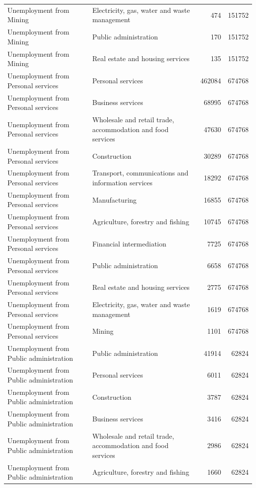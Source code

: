 \begin{longtable}{llrr}
Unemployment from Mining & Electricity, gas, water and waste management & 474 & 151752 \\
Unemployment from Mining & Public administration & 170 & 151752 \\
Unemployment from Mining & Real estate and housing services & 135 & 151752 \\
Unemployment from Personal services & Personal services & 462084 & 674768 \\
Unemployment from Personal services & Business services & 68995 & 674768 \\
Unemployment from Personal services & Wholesale and retail trade, accommodation and food services & 47630 & 674768 \\
Unemployment from Personal services & Construction & 30289 & 674768 \\
Unemployment from Personal services & Transport, communications and information services & 18292 & 674768 \\
Unemployment from Personal services & Manufacturing & 16855 & 674768 \\
Unemployment from Personal services & Agriculture, forestry and fishing & 10745 & 674768 \\
Unemployment from Personal services & Financial intermediation & 7725 & 674768 \\
Unemployment from Personal services & Public administration & 6658 & 674768 \\
Unemployment from Personal services & Real estate and housing services & 2775 & 674768 \\
Unemployment from Personal services & Electricity, gas, water and waste management & 1619 & 674768 \\
Unemployment from Personal services & Mining & 1101 & 674768 \\
Unemployment from Public administration & Public administration & 41914 & 62824 \\
Unemployment from Public administration & Personal services & 6011 & 62824 \\
Unemployment from Public administration & Construction & 3787 & 62824 \\
Unemployment from Public administration & Business services & 3416 & 62824 \\
Unemployment from Public administration & Wholesale and retail trade, accommodation and food services & 2986 & 62824 \\
Unemployment from Public administration & Agriculture, forestry and fishing & 1660 & 62824 \\

\end{longtable}
